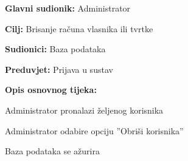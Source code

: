 				\noindent {}
				\begin{packed_item}
					
					\item \textbf{Glavni sudionik: } Administrator
					\item  \textbf{Cilj:} Brisanje računa vlasnika ili tvrtke
					\item  \textbf{Sudionici:} Baza podataka
					\item  \textbf{Preduvjet:} Prijava u sustav
					\item  \textbf{Opis osnovnog tijeka:}
					
					\item[] \begin{packed_enum}
						
						\item Administrator pronalazi željenog korisnika
						\item Administrator odabire opciju ”Obriši korisnika”
						\item Baza podataka se ažurira
					\end{packed_enum}
				\end{packed_item}
						
